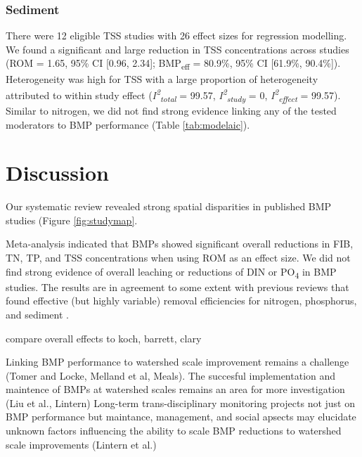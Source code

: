 \documentclass[utf8]{FrontiersinHarvard}
\begin{document}
\hypertarget{sediment}{%
\subsubsection{Sediment}\label{sediment}}

There were 12 eligible TSS studies with 26 effect sizes for regression modelling.
We found a significant and large reduction in TSS concentrations across studies (ROM = 1.65, 95\% CI {[}0.96, 2.34{]}; BMP\textsubscript{eff} = 80.9\%, 95\% CI {[}61.9\%, 90.4\%{]}).
Heterogeneity was high for TSS with a large proportion of heterogeneity attributed to within study effect (\textit{I\textsuperscript{2}\textsubscript{total}} = 99.57, \textit{I\textsuperscript{2}\textsubscript{study}} = 0, \textit{I\textsuperscript{2}\textsubscript{effect}} = 99.57).
Similar to nitrogen, we did not find strong evidence linking any of the tested moderators to BMP performance (Table \ref{tab:modelaic}).

\hypertarget{discussion}{%
\section{Discussion}\label{discussion}}

Our systematic review revealed strong spatial disparities in published BMP studies (Figure \ref{fig:studymap}.

Meta-analysis indicated that BMPs showed significant overall reductions in FIB, TN, TP, and TSS concentrations when using ROM as an effect size.
We did not find strong evidence of overall leaching or reductions of DIN or PO\textsubscript{4} in BMP studies.
The results are in agreement to some extent with previous reviews that found effective (but highly variable) removal efficiencies for nitrogen, phosphorus, and sediment \citep{claryBMPPerformanceAnalysis2011, kochNitrogenRemovalStormwater2014, liuReviewEffectivenessBest2017}.

compare overall effects to koch, barrett, clary

Linking BMP performance to watershed scale improvement remains a challenge (Tomer and Locke, Melland et al, Meals).
The succesful implementation and maintence of BMPs at watershed scales remains an area for more investigation (Liu et al., Lintern)
Long-term trans-disciplinary monitoring projects not just on BMP performance but maintance, management, and social apsects may elucidate unknown factors influencing the ability to scale BMP reductions to watershed scale improvements (Lintern et al.)
\end{document}
